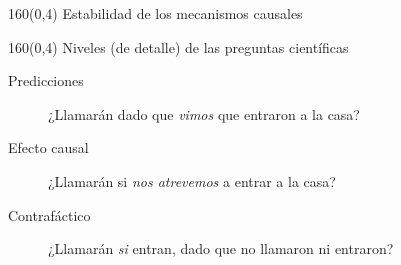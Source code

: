 \documentclass[shownotes,aspectratio=169]{beamer}
\begin{document}
\begin{frame}[plain]
 \begin{textblock}{160}(0,4)
 \centering \Large
 Estabilidad de los mecanismos causales
 \end{textblock}

 
 
\end{frame}


\begin{frame}[plain]
 \begin{textblock}{160}(0,4)
 \centering \Large
Niveles (de detalle) de las preguntas científicas
 \end{textblock}
 \vspace{0.75cm}
 
 \begin{description}
  \item[Predicciones] ¿Llamarán dado que \emph{vimos} que entraron a la casa?\\[0.2cm] \pause
  \item[Efecto causal] ¿Llamarán si \emph{nos atrevemos} a entrar a la casa?\\[0.2cm] \pause
  \item[Contrafáctico] ¿Llamarán \emph{si} entran, dado que no llamaron ni entraron?
 \end{description}

 
 \end{frame}

 
 
\end{document}
